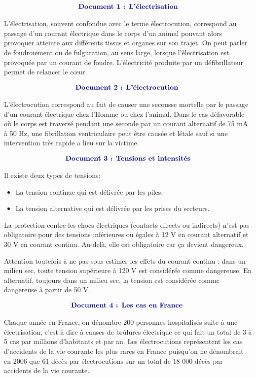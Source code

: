 \documentclass[10pt]{article}
\newcommand{\doctitle}[1]{ 
\begin{align*}
	\centering\textbf{\color{DarkBlue} {#1}}
\end{align*}	
}
\newcommand{\docOne}{ 
	\large
	\doctitle{Document 1 : L'électrisation}

		L'électrisation, souvent confondue avec le terme électrocution, correspond au passage d'un courant
		électrique dans le corps d'un animal pouvant alors provoquer atteinte aux différents
		tissus et organes sur son trajet.
		On peut parler de foudroiement ou de fulguration, au sens large, lorsque l'électrisation est
		provoquée par un courant de foudre. L'électricité produite par un défibrillateur permet de relancer le cœur.
		}
\newcommand{\docTwo}{ 
	\large
	\doctitle{Document 2 : L'électrocution }  
		
	L'électrocution correspond au fait de causer une secousse mortelle par le passage d'un courant
	électrique chez l'Homme ou chez l'animal. Dans le cas défavorable où le corps est traversé pendant
	une seconde par un courant alternatif de 75 mA à 50  Hz, une fibrillation ventriculaire peut
	être causée et létale sauf si une intervention très rapide a lieu sur la victime.
}
\newcommand{\docFour}{
	\large
	\doctitle{Document 4 : Les cas en France } 
		
		Chaque année en France, on dénombre 200 personnes hospitalisés suite à une électrisation, c'est à
		dire à causes de brûlures électrique ce qui fait un total de 3 à 5 cas par millions d'habitants et par
		an.
		Les électrocutions représentent les cas d'accidents de la vie courante les plus rares en France
		puisqu'on ne dénombrait en 2006 que 61 décès par électrocutions sur un total de 18 000 décès par
		accidents de la vie courante.
}
\newcommand{\docThree}{
	\large
	\doctitle{Document 3 : Tensions et intensités}

	Il existe deux types de tensions: 
	\begin{itemize}
		\item La tension continue qui est délivrée par les piles.
		\item La tension alternative qui est délivrée par les prises du secteurs.
	\end{itemize}
	La protection contre les chocs électriques (contacts directs ou indirects) n'est pas obligatoire pour
	des tensions inférieures ou égales à 12 V en courant alternatif et 30 V en courant continu. Au-delà,
	elle est obligatoire car ça devient dangereux.

	Attention toutefois à ne pas sous-estimer les effets du courant continu : dans un
	milieu sec, toute tension supérieure à 120 V est considérée comme dangereuse.
	En alternatif, toujours dans un milieu sec, la tension est considérée comme dangereuse à partir de
	50 V.
}
\begin{document}
		\begin{minipage}[t]{0.45\textwidth}
			\docOne
		\end{minipage}
		\hspace{10pt}
		\begin{minipage}[t]{0.45\textwidth}
			\docTwo
		\end{minipage}	

\begin{minipage}[t]{0.45\textwidth}
	\docThree
\end{minipage}
\hspace{10pt}
\begin{minipage}[t]{0.45\textwidth}
	\docFour 
\end{minipage}
\end{document}
